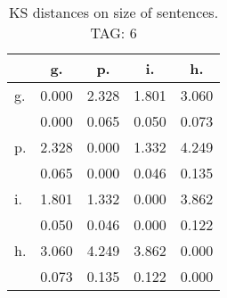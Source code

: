 \begin{table}[h!]
\begin{center}
\begin{tabular}{| l | c | c | c | c |}\hline
 & g. & p. & i. & h. \\\hline
g. & 0.000  & 2.328  & 1.801  & 3.060 \\\hline
 & 0.000  & 0.065  & 0.050  & 0.073 \\\hline
p. & 2.328  & 0.000  & 1.332  & 4.249 \\\hline
 & 0.065  & 0.000  & 0.046  & 0.135 \\\hline
i. & 1.801  & 1.332  & 0.000  & 3.862 \\\hline
 & 0.050  & 0.046  & 0.000  & 0.122 \\\hline
h. & 3.060  & 4.249  & 3.862  & 0.000 \\\hline
 & 0.073  & 0.135  & 0.122  & 0.000 \\\hline
\end{tabular}
\caption{KS distances on size of sentences. TAG: 6}
\end{center}
\end{table}
